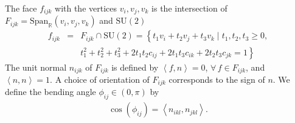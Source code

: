 \documentclass[aps,prd,notitlepage,nofootinbib,superscriptaddress,groupedaddress,twocolumn]{revtex4-1}
\def\R{\mathbb{R}}
\newcommand{\Su}{\mathrm{SU}(2)}
\def\be{\begin{eqnarray}}
\def\ee{\end{eqnarray}}
\newcommand{\cs}{\mathcal S}
\renewcommand{\a}{\alpha}
\renewcommand{\b}{\beta}
\renewcommand{\O}{\Omega}
\newcommand{\rmd}{\mathrm d}
\newcommand{\lag}{\left\langle}
\newcommand{\rag}{\right\rangle}
\begin{document}
The face $f_{ijk}$ with the vertices $v_i,v_j,v_k$ is the intersection of $F_{ijk}=\mathrm{Span}_\R(v_i,v_j,v_k)$ and $\Su$
\be
f_{i j k}&=&F_{i j k} \cap \Su=\left\{t_{1} v_{i}+t_{2} v_{j}+t_{3} v_{k} \mid t_{1}, t_{2}, t_{3} \geq 0,\right.\nonumber\\
&&\left.t_{1}^{2}+t_{2}^{2}+t_{3}^{2}+2 t_{1} t_{2} c_{i j}+2 t_{1} t_{3} c_{i k}+2 t_{2} t_{3} c_{j k}=1\right\}\nonumber
\ee
The unit normal $n_{ijk}$ of $F_{ijk}$ is defined by $\lag f,n\rag=0$, $\forall\,f\in F_{ijk}$, and $\lag n,n\rag=1$. A choice of orientation of $F_{ijk}$ corresponds to the sign of $n$. We define the bending angle $\phi_{ij}\in (0,\pi)$ by
\be
\cos(\phi_{ij})=\lag n_{ikl},n_{jkl}\rag.
\ee
\end{document}
